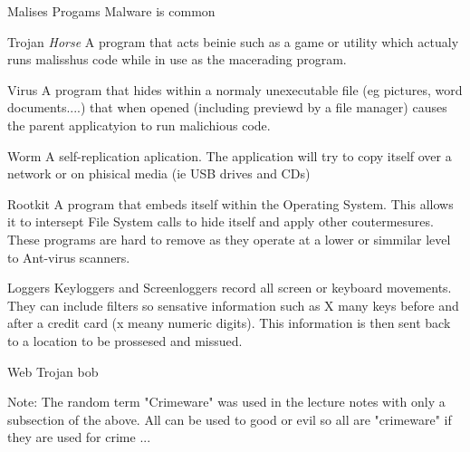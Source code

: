 \documentclass[11pt,twoside,a4paper]{article}
\begin{document}
  \clearpage
  
  \begin{section}{Malises Progams}
    Malware is common
      
      \begin{subsection}{Trojan \emph{Horse}}
        A program that acts beinie such as a game or utility which actualy runs malisshus code while in use as the macerading program.
      \end{subsection}
      
      \begin{subsection}{Virus}
        A program that hides within a normaly unexecutable file (eg pictures, word documents....) that when opened (including previewd by a file manager) causes the parent applicatyion to run malichious code.
      \end{subsection}
      
      \begin{subsection}{Worm}
        A self-replication aplication. The application will try to copy itself over a network or on phisical media (ie USB drives and CDs)
      \end{subsection}
      
      \begin{subsection}{Rootkit}
        A program that embeds itself within the Operating System. This allows it to intersept File System calls to hide itself and apply other coutermesures. These programs are hard to remove as they operate at a lower or simmilar level to Ant-virus scanners.
      \end{subsection}
      
      \begin{subsection}{Loggers}
        Keyloggers and Screenloggers record all screen or keyboard movements. They can include filters so sensative information such as X many keys before and after a credit card (x meany numeric digits). This information is then sent back to a location to be prossesed and missued.
      \end{subsection}
      
      \begin{subsection}{Web Trojan}
        bob
      \end{subsection}
      
      Note: The random term "Crimeware" was used in the lecture notes with only a subsection of the above. All can be used to good or evil so all are "crimeware" if they are used for crime ...
  
  \end{section}
  
\end{document}

